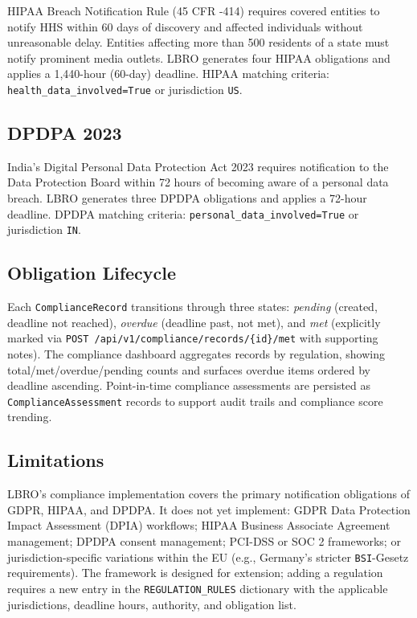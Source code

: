 \documentclass[conference]{IEEEtran}
\begin{document}
HIPAA Breach Notification Rule (45 CFR -414) requires covered entities to notify HHS within 60 days of discovery and affected individuals without unreasonable delay. Entities affecting more than 500 residents of a state must notify prominent media outlets. LBRO generates four HIPAA obligations and applies a 1,440-hour (60-day) deadline. HIPAA matching criteria: \texttt{health\_data\_involved=True} or jurisdiction \texttt{US}.

\subsection{DPDPA 2023}

India's Digital Personal Data Protection Act 2023 requires notification to the Data Protection Board within 72 hours of becoming aware of a personal data breach. LBRO generates three DPDPA obligations and applies a 72-hour deadline. DPDPA matching criteria: \texttt{personal\_data\_involved=True} or jurisdiction \texttt{IN}.

\subsection{Obligation Lifecycle}

Each \texttt{ComplianceRecord} transitions through three states: \textit{pending} (created, deadline not reached), \textit{overdue} (deadline past, not met), and \textit{met} (explicitly marked via \texttt{POST /api/v1/compliance/records/\{id\}/met} with supporting notes). The compliance dashboard aggregates records by regulation, showing total/met/overdue/pending counts and surfaces overdue items ordered by deadline ascending. Point-in-time compliance assessments are persisted as \texttt{ComplianceAssessment} records to support audit trails and compliance score trending.

\subsection{Limitations}

LBRO's compliance implementation covers the primary notification obligations of GDPR, HIPAA, and DPDPA. It does not yet implement: GDPR Data Protection Impact Assessment (DPIA) workflows; HIPAA Business Associate Agreement management; DPDPA consent management; PCI-DSS or SOC 2 frameworks; or jurisdiction-specific variations within the EU (e.g., Germany's stricter \texttt{BSI}-Gesetz requirements). The framework is designed for extension; adding a regulation requires a new entry in the \texttt{REGULATION\_RULES} dictionary with the applicable jurisdictions, deadline hours, authority, and obligation list.
\end{document}
